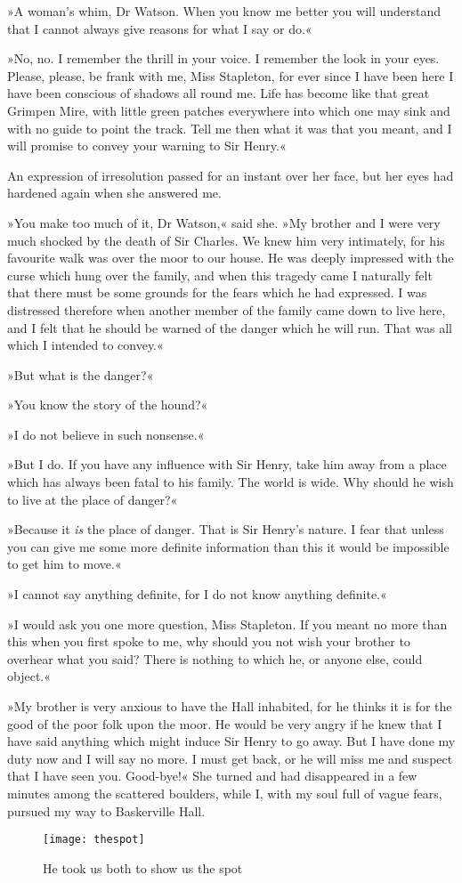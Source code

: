»A woman's whim, Dr Watson. When you know me better you will understand that I cannot always give reasons for what I say or do.«

»No, no. I remember the thrill in your voice. I remember the look in your eyes. Please, please, be frank with me, Miss Stapleton, for ever since I have been here I have been conscious of shadows all round me. Life has become like that great Grimpen Mire, with little green patches everywhere into which one may sink and with no guide to point the track. Tell me then what it was that you meant, and I will promise to convey your warning to Sir Henry.«

An expression of irresolution passed for an instant over her face, but her eyes had hardened again when she answered me.

»You make too much of it, Dr Watson,« said she. »My brother and I were very much shocked by the death of Sir Charles. We knew him very intimately, for his favourite walk was over the moor to our house. He was deeply impressed with the curse which hung over the family, and when this tragedy came I naturally felt that there must be some grounds for the fears which he had expressed. I was distressed therefore when another member of the family came down to live here, and I felt that he should be warned of the danger which he will run. That was all which I intended to convey.«

»But what is the danger?«

»You know the story of the hound?«

»I do not believe in such nonsense.«

»But I do. If you have any influence with Sir Henry, take him away from a place which has always been fatal to his family. The world is wide. Why should he wish to live at the place of danger?«

»Because it \textit{is} the place of danger. That is Sir Henry's nature. I fear that unless you can give me some more definite information than this it would be impossible to get him to move.«

»I cannot say anything definite, for I do not know anything definite.«

»I would ask you one more question, Miss Stapleton. If you meant no more than this when you first spoke to me, why should you not wish your brother to overhear what you said? There is nothing to which he, or anyone else, could object.«

»My brother is very anxious to have the Hall inhabited, for he thinks it is for the good of the poor folk upon the moor. He would be very angry if he knew that I have said anything which might induce Sir Henry to go away. But I have done my duty now and I will say no more. I must get back, or he will miss me and suspect that I have seen you. Good-bye!« She turned and had disappeared in a few minutes among the scattered boulders, while I, with my soul full of vague fears, pursued my way to Baskerville Hall.
\cleardoubleevenpage
\vfill
\begin{figure}[tbph]
\centering
\texttt{[image: thespot]}
\caption{He took us both to show us the spot}
\end{figure}
\vfill
\thispagestyle{empty}
\clearpage
